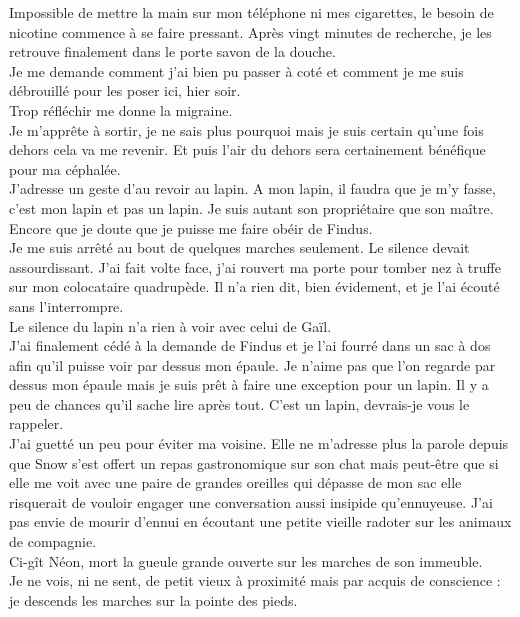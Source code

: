 Impossible de mettre la main sur mon téléphone ni mes cigarettes, le besoin de nicotine commence à se faire pressant. Après vingt minutes de recherche, je les retrouve finalement dans le porte savon de la douche. \\
Je me demande comment j'ai bien pu passer à coté et comment je me suis débrouillé pour les poser ici, hier soir. \\
Trop réfléchir me donne la migraine. \\

Je m’apprête à sortir, je ne sais plus pourquoi mais je suis certain qu'une fois dehors cela va me revenir. Et puis l'air du dehors sera certainement bénéfique pour ma céphalée. \\
J'adresse un geste d'au revoir au lapin. A mon lapin, il faudra que je m'y fasse, c'est mon lapin et pas un lapin. Je suis autant son propriétaire que son maître. Encore que je doute que je puisse me faire obéir de Findus. \\

Je me suis arrêté au bout de quelques marches seulement. Le silence devait assourdissant. J'ai fait volte face, j'ai rouvert ma porte pour tomber nez à truffe sur mon colocataire quadrupède. Il n'a rien dit, bien évidement, et je l'ai écouté sans l’interrompre. \\
Le silence du lapin n'a rien à voir avec celui de Gaïl. \\

J'ai finalement cédé à la demande de Findus et je l'ai fourré dans un sac à dos afin qu'il puisse voir par dessus mon épaule. Je n'aime pas que l'on regarde par dessus mon épaule mais je suis prêt à faire une exception pour un lapin. Il y a peu de chances qu'il sache lire après tout. C'est un lapin, devrais-je vous le rappeler. \\

J'ai guetté un peu pour éviter ma voisine. Elle ne m'adresse plus la parole depuis que Snow s'est offert un repas gastronomique sur son chat mais peut-être que si elle me voit avec une paire de grandes oreilles qui dépasse de mon sac elle risquerait de vouloir engager une conversation aussi insipide qu'ennuyeuse. J'ai pas envie de mourir d'ennui en écoutant une petite vieille radoter sur les animaux de compagnie. \\
Ci-gît Néon, mort la gueule grande ouverte sur les marches de son immeuble.\\
Je ne vois, ni ne sent, de petit vieux à proximité mais par acquis de conscience : je descends les marches sur la pointe des pieds. \\

